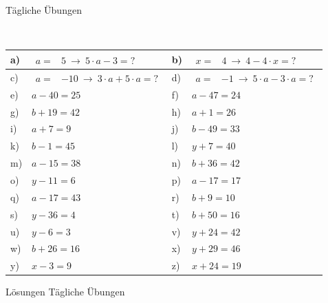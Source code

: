 \documentclass[12pt]{article}
\begin{document}
\centerline{{\Large Tägliche Übungen}} 
\vspace{1cm}
\noindent \\


\begin{xltabular}{\textwidth}{|C{0.75cm}|X|C{0.75cm}|X|}
\hline
a)&$\begin{aligned}
 a=&5~ \rightarrow ~ 5 \cdot a - 3=?
\end{aligned}$
&
b)&$\begin{aligned}
 x=&4~ \rightarrow ~ 4 - 4 \cdot x=?
\end{aligned}$
\\\hline
c)&$\begin{aligned}
 a=&-10~ \rightarrow ~ 3 \cdot a + 5 \cdot a=?
\end{aligned}$
&
d)&$\begin{aligned}
 a=&-1~ \rightarrow ~ 5 \cdot a - 3 \cdot a=?
\end{aligned}$
\\\hline
e)&$a-40 = 25$
&
f)&$a-47 = 24$
\\\hline
g)&$b+19 = 42$
&
h)&$a+1 = 26$
\\\hline
i)&$a+7 = 9$
&
j)&$b-49 = 33$
\\\hline
k)&$b-1 = 45$
&
l)&$y+7 = 40$
\\\hline
m)&$a-15 = 38$
&
n)&$b+36 = 42$
\\\hline
o)&$y-11 = 6$
&
p)&$a-17 = 17$
\\\hline
q)&$a-17 = 43$
&
r)&$b+9 = 10$
\\\hline
s)&$y-36 = 4$
&
t)&$b+50 = 16$
\\\hline
u)&$y-6 = 3$
&
v)&$y+24 = 42$
\\\hline
w)&$b+26 = 16$
&
x)&$y+29 = 46$
\\\hline
y)&$x-3 = 9$
&
z)&$x+24 = 19$
\\\hline
\end{xltabular}
\vspace{0.5cm}
\newpage
{}
\centerline{{\large Lösungen Tägliche Übungen}} 
\vspace{0.5cm}
\end{document}
